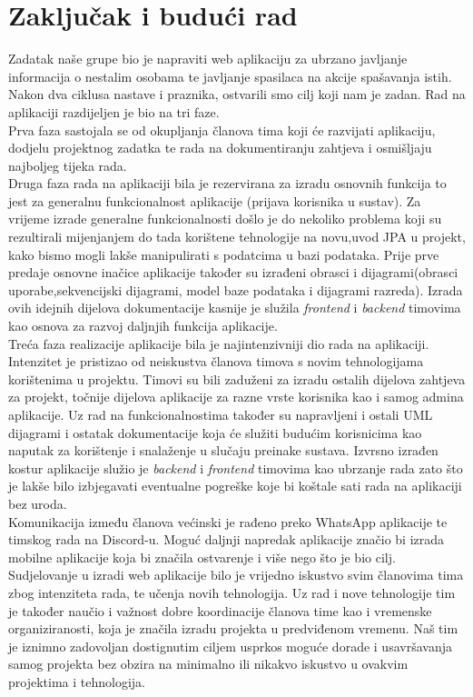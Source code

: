 \chapter{Zaključak i budući rad}
		
		
	 		{Zadatak naše grupe bio je napraviti web aplikaciju za ubrzano 	javljanje informacija o nestalim osobama te javljanje spasilaca na akcije spašavanja istih. Nakon dva ciklusa nastave i praznika, ostvarili smo cilj koji nam je zadan. Rad na aplikaciji razdijeljen je bio na tri faze.\\
	 			Prva faza sastojala se od okupljanja članova tima koji će razvijati aplikaciju, dodjelu projektnog zadatka te rada na dokumentiranju zahtjeva i osmišljaju najboljeg tijeka rada.\\
	 			Druga faza rada na aplikaciji bila je rezervirana za izradu osnovnih funkcija to jest za generalnu funkcionalnost aplikacije (prijava korisnika u sustav). Za vrijeme izrade generalne funkcionalnosti došlo je do nekoliko problema koji su rezultirali mijenjanjem do tada korištene tehnologije na novu,uvod JPA u projekt, kako bismo mogli lakše manipulirati s podatcima u bazi podataka. Prije prve predaje osnovne inačice aplikacije također su izrađeni obrasci i dijagrami(obrasci uporabe,sekvencijski dijagrami, model baze podataka i dijagrami razreda). Izrada ovih idejnih dijelova dokumentacije kasnije je služila \textit{frontend} i \textit{backend} timovima kao osnova za razvoj daljnjih funkcija aplikacije.\\
	 			Treća faza realizacije aplikacije bila je najintenzivniji dio rada na aplikaciji. Intenzitet je pristizao od neiskustva članova timova s novim tehnologijama korištenima u projektu. Timovi su bili zaduženi za izradu ostalih dijelova zahtjeva za projekt, točnije dijelova aplikacije za razne vrste korisnika kao i samog admina aplikacije. Uz rad na funkcionalnostima također su napravljeni i ostali UML dijagrami i ostatak dokumentacije koja će služiti budućim korisnicima kao naputak za korištenje i snalaženje u slučaju preinake sustava. Izvrsno izrađen kostur aplikacije služio je \textit{backend} i \textit{frontend} timovima kao ubrzanje rada zato što je lakše bilo izbjegavati eventualne pogreške koje bi koštale sati rada na aplikaciji bez uroda.\\ 
	 			Komunikacija između članova većinski je rađeno preko WhatsApp aplikacije te timskog rada na Discord-u. Moguć daljnji napredak aplikacije značio bi izrada mobilne aplikacije koja bi značila ostvarenje i više nego što je bio cilj.\\
	 			Sudjelovanje u izradi web aplikacije bilo je vrijedno iskustvo svim članovima tima zbog intenziteta rada, te učenja novih tehnologija. Uz rad i nove tehnologije tim je također naučio i važnost dobre koordinacije članova time kao i vremenske organiziranosti, koja je značila izradu projekta u predviđenom vremenu. Naš tim je iznimno zadovoljan dostignutim ciljem usprkos moguće dorade i usavršavanja samog projekta bez obzira na minimalno ili nikakvo iskustvo u ovakvim projektima i tehnologija.
	 	 } 
		
		\eject 
